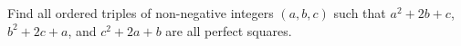 Find all ordered triples of non-negative integers $(a,b,c)$ such that $a^2+2b+c$, $b^2+2c+a$, and $c^2+2a+b$ are all perfect squares.

